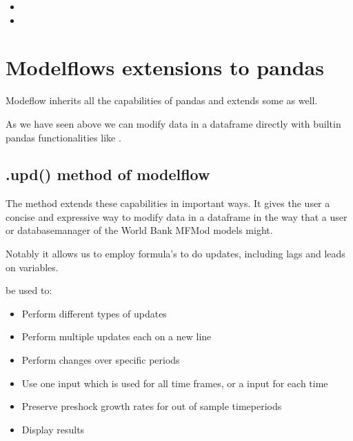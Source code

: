 \documentclass[letterpaper,10pt,english]{jupyterBook}
\begin{document}
\sphinxAtStartPar
{}
\begin{itemize}
\item {} 
\sphinxAtStartPar
{}

\item {} 
\sphinxAtStartPar
{}

\end{itemize}

\sphinxstepscope


\chapter{Modelflows extensions to pandas}
\label{\detokenize{content/04_PythonEssentials/UpdateCommand:modelflows-extensions-to-pandas}}\label{\detokenize{content/04_PythonEssentials/UpdateCommand::doc}}
\sphinxAtStartPar
Modeflow inherits all the capabilities of pandas and extends some as well.

\sphinxAtStartPar
As we have seen above we can modify data in a dataframe directly with built\sphinxhyphen{}in pandas functionalities like .


\section{.upd() method of modelflow}
\label{\detokenize{content/04_PythonEssentials/UpdateCommand:upd-method-of-modelflow}}
\sphinxAtStartPar
The  method extends these capabilities in important ways.  It gives the user a concise and expressive way to modify data in a dataframe in the way that a user or database\sphinxhyphen{}manager of the World Bank MFMod models might.

\sphinxAtStartPar
Notably it allows us to employ formula’s to do updates, including lags and leads on variables.

\sphinxAtStartPar
{}  be used to:
\begin{itemize}
\item {} 
\sphinxAtStartPar
Perform different types of  updates

\item {} 
\sphinxAtStartPar
Perform multiple updates each on a new line

\item {} 
\sphinxAtStartPar
Perform changes over specific periods

\item {} 
\sphinxAtStartPar
Use one input which is used for all time frames, or a input for each time

\item {} 
\sphinxAtStartPar
Preserve pre\sphinxhyphen{}shock growth rates for out of sample time\sphinxhyphen{}periods

\item {} 
\sphinxAtStartPar
Display results

\end{itemize}
\end{document}
